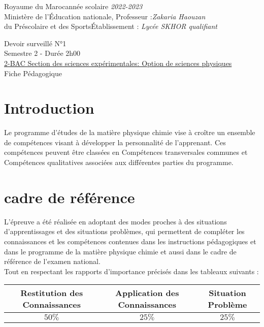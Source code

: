 \documentclass[12pt]{article}
\newcommand\headerMe[2]{\noindent{}#1\hfill#2}
\begin{document}
\headerMe{Royaume du Maroc}{année scolaire \emph{2022-2023}}\\
\headerMe{Ministère de l'Éducation nationale, }{  Professeur :\emph{Zakaria Haouzan}}\\
\headerMe{du Préscolaire et des Sports}{Établissement : \emph{Lycée SKHOR qualifiant}}\\

\begin{center}
Devoir surveillé N°1 \\
Semestre 2 - Durée 2h00\\
\underline{2-BAC Section des sciences expérimentales: Option de sciences physiques}\\

    \vspace{.2cm}
\hrulefill
\Large{Fiche Pédagogique}
\hrulefill\\
\end{center}


\section[A]{Introduction }
\hspace{0.5cm}Le programme d'études de la matière physique chimie vise à croître un ensemble de compétences visant à développer la personnalité de l'apprenant. Ces compétences peuvent être classées en Compétences transversales communes et Compétences qualitatives associées aux différentes parties du programme.
\section{cadre de référence }
 \hspace{0.5cm}L'épreuve a été réalisée en adoptant des modes proches à des situations d'apprentissages et des situations problèmes, qui permettent de compléter les connaissances et les compétences contenues dans les instructions pédagogiques et dans le programme de la matière physique chimie et aussi dans le cadre de référence de l'examen national. 
 \\Tout en respectant les rapports d'importance précisés dans les tableaux suivants :
 \begin{center}
\begin{tabular}{|c||c||c|}
\hline
    \textbf{Restitution des Connaissances} & \textbf{Application des Connaissances} & \textbf{Situation Problème }\\
    \hline 
    $50\%$ & $25\%$ & $25\%$\\
    \hline
\end{tabular} 
\end{center}
\end{document}

